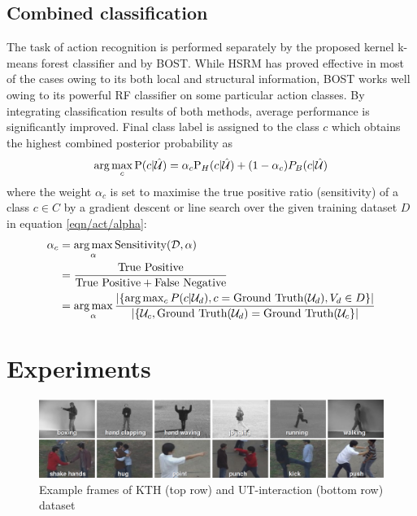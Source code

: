 \subsection{Combined classification} 
The task of action recognition is performed separately by the proposed kernel k-means forest classifier and by BOST. While HSRM has proved effective in most of the cases owing to its both local and structural information, BOST works well owing to its powerful RF classifier on some particular action classes. By integrating classification results of both methods, average performance is significantly improved. Final class label is assigned to the class $c$ which obtains the highest combined posterior probability as
\begin{equation}
	\arg\max_{c}\mathrm{P}(c|\mathcal{\hat{U}}) = \alpha_c \mathrm{P}_{H}(c|\mathcal{\hat{U}}) + (1 - \alpha_c) P_{B}(c|\mathcal{\hat{U}})
	\label{eqn/act/combine}
\end{equation}
where the weight $\alpha_c$ is set to maximise the true positive ratio (sensitivity) of a class $c \in C$ by a gradient descent or line search over the given training dataset $D$ in equation \ref{eqn/act/alpha}:
\begin{equation}
\begin{aligned}
	\alpha_c & = \displaystyle\operatorname*{arg\,max}_{\alpha}\mbox{Sensitivity}(\mathcal{D},\alpha) \\
	& = \displaystyle\frac{\mbox{True Positive}}{\mbox{True Positive} + \mbox{False Negative}} \\
&= \displaystyle\operatorname*{arg\,max}_{\alpha}\displaystyle\frac{\left|\{\arg\max_{c}P(c|\mathcal{U}_d),c=\mbox{Ground Truth}(\mathcal{U}_d),V_d \in D\}\right|}{\left|\{\mathcal{U}_c, \mbox{Ground Truth}(\mathcal{U}_d) = \mbox{Ground Truth}(\mathcal{U}_c\}\right|}
\end{aligned}
\label{eqn/act/alpha}
\end{equation}

\section{Experiments}
\label{sec/act/experiments}

\begin{figure}[ht]
	\centering
	\includegraphics[width=1\linewidth]{fig/act/frames.png}
	\caption{Example frames of KTH (top row) and UT-interaction (bottom row) dataset}
	\label{fig/act/frames}
\end{figure}

